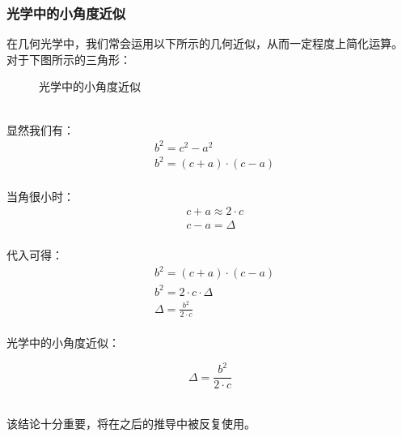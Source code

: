 \documentclass[UTF8]{ctexart}
\begin{document}
\subsubsection{光学中的小角度近似}
    在几何光学中，我们常会运用以下所示的几何近似，从而一定程度上简化运算。\\[3mm]
    对于下图所示的三角形：
    \begin{figure}[h]
        \begin{center}
            \caption{光学中的小角度近似}
        \end{center}
    \end{figure}\\
    显然我们有：
    \setcounter{equation}{0}
    \begin{align}
        &b^2=c^2-a^2\\[3mm]
        &b^2=(c+a)\cdot(c-a)
    \end{align}\\
    当角很小时：
    \begin{align}
        &c+a\approx 2\cdot c\\[3mm]
        &c-a=\Delta
    \end{align}\\
    代入可得：
    \begin{align}
        &b^2=(c+a)\cdot(c-a)\\[3mm]
        &b^2=2\cdot c\cdot \Delta\\[3mm]
        &\Delta=\frac{b^2}{2\cdot c}
    \end{align}\\
    光学中的小角度近似：
    \begin{large}
        \begin{equation*}
            \Delta=\frac{b^2}{2\cdot c}
        \end{equation*}
    \end{large}\\
    该结论十分重要，将在之后的推导中被反复使用。
\end{document}
